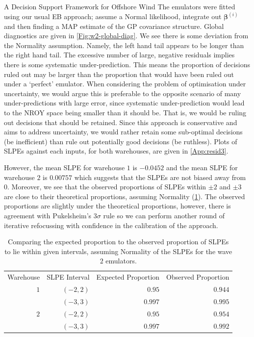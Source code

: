 \begin{chapter}{A Decision Support Framework for Offshore Wind \label{Ch:ds-for-ow}}
The emulators were fitted using our usual EB approach; assume a Normal likelihood, integrate out $\bm{\beta}^{(i)}$ and then finding a MAP estimate of the GP covariance structure. Global diagnostics are given in \cref{Fig:w2-global-diag}. We see there is some deviation from the Normality assumption. Namely, the left hand tail appears to be longer than the right hand tail. The excessive number of large, negative residuals implies there is some systematic under-prediction. This means the proportion of decisions ruled out may be larger than the proportion that would have been ruled out under a `perfect' emulator. When considering the problem of optimisation under uncertainty, we would argue this is preferable to the opposite scenario of many under-predictions with large error, since systematic under-prediction would lead to the NROY space being smaller than it should be. That is, we would be ruling out decisions that should be retained. Since this approach is conservative and aims to address uncertainty, we would rather retain some sub-optimal decisions (be inefficient) than rule out potentially good decisions (be ruthless). Plots of SLPEs against each inputs, for both warehouses, are given in \cref{App:resid3}.

However, the mean SLPE for warehouse $1$ is $-0.0452$ and the mean SLPE for warehouse $2$ is $0.00757$ which suggests that the SLPEs are not biased away from $0$. Moreover, we see that the observed proportions of SLPEs within $\pm2$ and $\pm3$ are close to their theoretical proportions, assuming Normality (\cref{Tab:cred2}). The observed proportions are slightly under the theoretical proportions, however, there is agreement with Pukelsheim's $3\sigma$ rule so we can perform another round of iterative refocussing with confidence in the calibration of the approach.
\begin{table}
 \centering
 \begin{tabular}{rrrr}
  \toprule
  Warehouse & SLPE Interval & Expected Proportion & Observed Proportion \\\cmidrule{1-4}
  $1$ & $(-2,2)$&$0.95$ & $0.944$\\
  &$(-3,3)$& $0.997$ & $0.995$ \\\cmidrule{1-4}
  $2$ & $(-2,2)$&$0.95$ & $0.954$\\
  &$(-3,3)$& $0.997$ & $0.992$ \\\bottomrule
 \end{tabular}
 \caption{Comparing the expected proportion to the observed proportion of SLPEs to lie within given intervals, assuming Normality of the SLPEs for the wave $2$ emulators.}
 \label{Tab:cred2}
\end{table}

\end{chapter}
